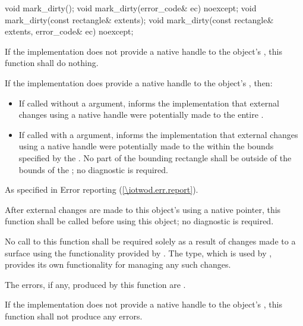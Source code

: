 \begin{itemdecl}
void mark_dirty();
void mark_dirty(error_code& ec) noexcept;
void mark_dirty(const rectangle& extents);
void mark_dirty(const rectangle& extents, error_code& ec) noexcept;
\end{itemdecl}
\begin{itemdescr}
\pnum
\effects
If the implementation does not provide a native handle to the  object's \underlyingsurface, this function shall do nothing.

\pnum
If the implementation does provide a native handle to the  object's \underlyingsurface, then:
\begin{itemize}
	\item If called without a  argument, informs the implementation that external changes using a native handle were potentially made to the entire \underlyingsurface.
	\item If called with a  argument, informs the implementation that external changes using a native handle were potentially made to the \underlyingsurface within the bounds specified by the  . No part of the bounding rectangle shall be outside of the bounds of the \underlyingsurface; no diagnostic is required.
\end{itemize}

\pnum
\throws
As specified in Error reporting (\ref{\iotwod.err.report}).

\pnum
\remarks
After external changes are made to this  object's \underlyingsurface using a native pointer, this function shall be called before using this  object; no diagnostic is required.

\pnum
No call to this function shall be required solely as a result of changes made to a surface using the functionality provided by .
\enternote
The  type, which is used by , provides its own functionality for managing any such changes.
\exitnote

\pnum
\errors
The errors, if any, produced by this function are .

\pnum
If the implementation does not provide a native handle to the  object's \underlyingsurface, this function shall not produce any errors.
\end{itemdescr}

